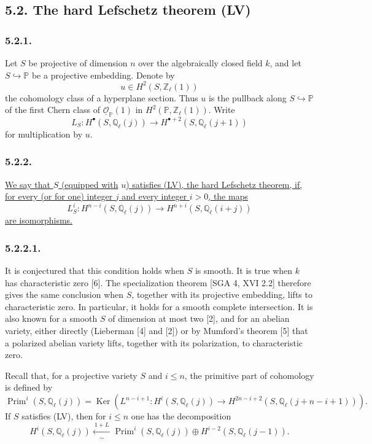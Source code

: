 \subsection*{5.2. The hard Lefschetz theorem (LV)}

\subsubsection*{5.2.1.}
Let $S$ be projective of dimension $n$ over the algebraically closed field
$k$, and let $S\hookrightarrow\mathbb P$ be a projective embedding.  Denote by
\[
u\in H^2(S,\mathbb Z_\ell(1))
\]
the cohomology class of a hyperplane section.  Thus $u$ is the pullback along
$S\hookrightarrow\mathbb P$ of the first Chern class of
$\underline{\mathcal O}_{\mathbb P}(1)$ in
$H^2(\mathbb P,\mathbb Z_\ell(1))$.  Write
\[
L_S:H^\bullet(S,\mathbb Q_\ell(j))
   \longrightarrow H^{\bullet+2}(S,\mathbb Q_\ell(j+1))
\]
for multiplication by $u$.

\subsubsection*{5.2.2.}
\underline{We say that $S$ (equipped with} $u$\underline{) satisfies (LV), the hard
Lefschetz theorem, if, for every (or for one) integer $j$ and every integer
$i>0$, the maps}
\[
L_S^i:H^{n-i}(S,\mathbb Q_\ell(j))
\longrightarrow H^{n+i}(S,\mathbb Q_\ell(i+j))
\]
\underline{are isomorphisms.}

\subsubsection*{5.2.2.1.}
It is conjectured that this condition holds when $S$ is smooth.  It is true
when $k$ has characteristic zero [6].  The specialization theorem
[SGA 4, XVI 2.2] therefore gives the same conclusion when $S$, together with
its projective embedding, lifts to characteristic zero.  In particular, it
holds for a smooth complete intersection.  It is also known for a smooth $S$
of dimension at most two [2], and for an abelian variety, either directly
(Lieberman [4] and [2]) or by Mumford's theorem [5] that a polarized abelian
variety lifts, together with its polarization, to characteristic zero.

Recall that, for a projective variety $S$ and $i\leq n$, the primitive part of
cohomology is defined by
\begin{equation}\tag{5.2.2.2}
\operatorname{Prim}^i(S,\mathbb Q_\ell(j))
=\operatorname{Ker}\!\left(
L^{n-i+1}:H^i(S,\mathbb Q_\ell(j))
\longrightarrow
H^{2n-i+2}(S,\mathbb Q_\ell(j+n-i+1))
\right).
\end{equation}
If $S$ satisfies (LV), then for $i\leq n$ one has the decomposition
\begin{equation}\tag{5.2.2.3}
H^i(S,\mathbb Q_\ell(j))
\xleftarrow[\sim]{\ 1+L\ }
\operatorname{Prim}^i(S,\mathbb Q_\ell(j))
\oplus H^{i-2}(S,\mathbb Q_\ell(j-1)).
\end{equation}

